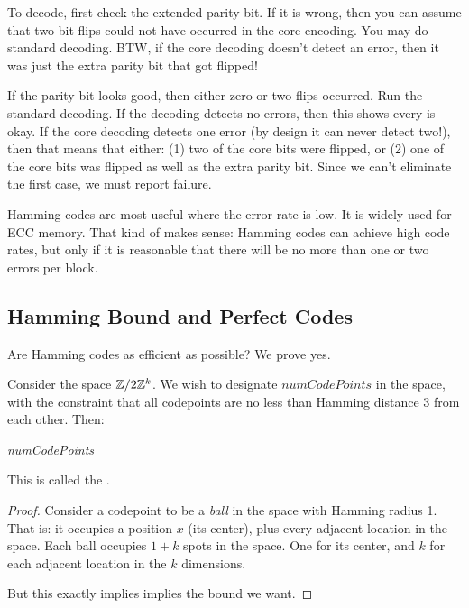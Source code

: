 \documentclass[11pt, oneside]{amsart}
\begin{document}
To decode, first check the extended parity bit. If it is wrong, then you
can assume that two bit flips could not have occurred in the core
encoding. You may do standard decoding. BTW, if the core decoding
doesn't detect an error, then it was just the extra parity bit that got
flipped!

If the parity bit looks good, then either zero or two flips occurred.
Run the standard decoding. If the decoding detects no errors, then this
shows every is okay. If the core decoding detects one error (by design
it can never detect two!), then that means that either: (1) two of the
core bits were flipped, or (2) one of the core bits was flipped as well
as the extra parity bit. Since we can't eliminate the first case, we
must report failure.

Hamming codes are most useful where the error rate is low. It is widely
used for ECC memory. That kind of makes sense: Hamming codes can achieve
high code rates, but only if it is reasonable that there will be no more
than one or two errors per block.

\subsection{Hamming Bound and Perfect Codes}

Are Hamming codes as efficient as possible? We prove yes.

\begin{theorem}
  Consider the space $\mathbb{Z} / 2\mathbb{Z}^k$. We wish to designate
  $\textit{numCodePoints}$ in the space, with the constraint that all
  codepoints are no less than Hamming distance $3$ from each other.
  Then:

  \begin{nedqn}
    \textit{numCodePoints}
  \leqcol
  \end{nedqn}

  This is called the .
\end{theorem}

\begin{proof}
  Consider a codepoint to be a \emph{ball} in the space with Hamming
  radius 1. That is: it occupies a position $x$ (its center), plus every
  adjacent location in the space. Each ball occupies $1 + k$ spots in
  the space. One for its center, and $k$ for each adjacent location in
  the $k$ dimensions.

  But this exactly implies implies the bound we want.
\end{proof}
\end{document}

